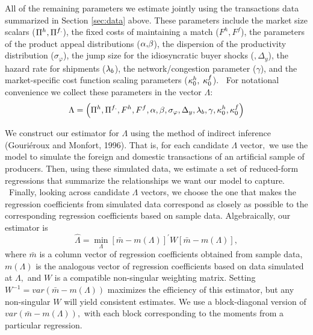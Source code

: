 \documentclass[12pt]{article}
\begin{document}
All of the remaining parameters we estimate jointly using the transactions
data summarized in Section \ref{sec:data} above. These parameters include
the market size scalars (${\small \Pi }^{h},{\small \Pi }^{f.}$), the fixed
costs of maintaining a match ($F^{h},F^{f}$), the parameters of the product
appeal distributions (${\small \alpha }{\small ,}{\small \beta }$), the
dispersion of the productivity distribution ($\sigma _{\varphi }$), the jump
size for the idiosyncratic buyer shocks ($,\Delta _{y}$), the hazard rate
for shipments (${\small \lambda }_{b}$), the network/congestion parameter ($%
\gamma $), and the market-specific cost function scaling parameters ($%
{\small \kappa _{0}^{h},}$ ${\small \kappa _{0}^{f}}$). \textbf{\ }For
notational convenience we collect these parameters in the vector $\Lambda :$%
\begin{equation*}
\Lambda =\left( {\small \Pi }^{h},{\small \Pi }^{f.},F^{h},F^{f},{\small %
\alpha },{\small \beta },\sigma _{\varphi },\Delta _{y},{\small \lambda }%
_{b},{\small \gamma ,\kappa _{0}^{h},\kappa _{0}^{f}}\right)
\end{equation*}

We construct our estimator for $\Lambda $ using the method of indirect
inference (Gouri\'{e}roux and Monfort, 1996). That is, for each candidate $%
\Lambda $ vector$,$ we use the model to simulate the foreign and domestic
transactions of an artificial sample of producers. Then, using these
simulated data, we estimate a set of reduced-form regressions that summarize
the relationships we want our model to capture. \ Finally, looking across
candidate $\Lambda $ vectors, we choose the one that makes the regression
coefficients from simulated data correspond as closely as possible to the
corresponding regression coefficients based on sample data. Algebraically,
our estimator is 
\begin{equation*}
\hat{\Lambda}=\min_{\Lambda }\left[ \bar{m}-m(\Lambda )\right] ^{\prime }W%
\left[ \bar{m}-m(\Lambda )\right] ,
\end{equation*}%
where $\bar{m}$ is a column vector of regression coefficients obtained from
sample data, $m(\Lambda )$ is the analogous vector of regression
coefficients based on data simulated at $\Lambda ,$ and $W$ is a compatible
non-singular weighting matrix. Setting $W^{-1}=var(\bar{m}-m(\Lambda ))$
maximizes the efficiency of this estimator, but any non-singular $W$ will
yield consistent estimates. We use a block-diagonal version of $var(\bar{m}%
-m(\Lambda )),$ with each block corresponding to the moments from a
particular regression.
\end{document}
